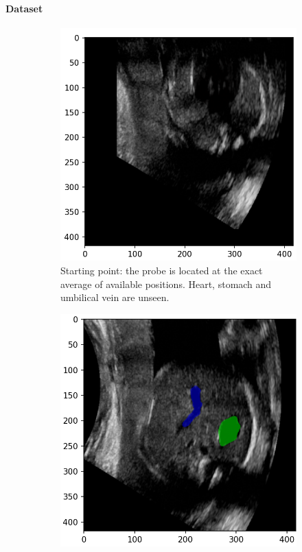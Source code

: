 \paragraph{Dataset}

\begin{figure}
    \centering
    \begin{subfigure}{.45\linewidth}
      \centering
      \includegraphics[width=.95\linewidth]{images/fetal_start.PNG}
      \caption{Starting point: the probe is located at the exact average of available positions. Heart, stomach and umbilical vein are unseen.}
      \label{fig:img-before}
    \end{subfigure}%
    \begin{subfigure}{.45\linewidth}
      \centering
      \includegraphics[width=.95\linewidth]{images/fetal_goal.PNG}

\end{subfigure}
\end{figure}
